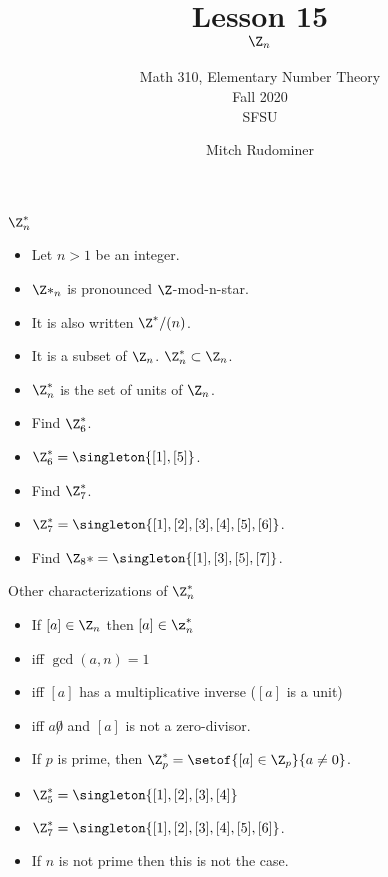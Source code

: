 \documentclass{beamer}
\title{Lesson 15 \\ $\Z_n$}
\subtitle{Math 310, Elementary Number Theory \\ Fall 2020 \\ SFSU}
\author{Mitch Rudominer}
\date{}
\begin{document}
\begin{frame}
  \titlepage
\end{frame}

\begin{frame}{$\Z^*_n$}

\begin{itemize}
  \item Let $n>1$ be an integer.
  \item $\Z*_n$ is pronounced $\Z$-mod-n-star.
  \item It is also written $\Z^*/(n)$.
  \item It is a subset of $\Z_n$. $\Z_n^* \subset \Z_n$.
  \item $\Z^*_n$ is the set of units of $\Z_n$.
  \item Find $\Z_6^*$.
  \item $\Z_6^*=\singleton{[1],[5]}$.
  \item Find $\Z_7^*$.
  \item $\Z_7^*=\singleton{[1],[2],[3],[4],[5],[6]}$.
  \item Find $\Z_8* = \singleton{[1],[3],[5],[7]}$.
\end{itemize}

\end{frame}

\begin{frame}{Other characterizations of $\Z^*_n$}

\begin{itemize}
  \item If $[a]\in\Z_n$ then $[a]\in\z_n^*$
  \item iff $\gcd(a,n)=1$
  \item iff $[a]$ has a multiplicative inverse ($[a]$ is a unit)
  \item iff $a\not 0$ and $[a]$ is not a zero-divisor.
  \item If $p$ is prime, then $\Z_p^*=\setof{[a]\in\Z_p}{a\not=0}$.
  \item $\Z_5^*=\singleton{[1],[2],[3],[4]}$
  \item $\Z_7^*=\singleton{[1],[2],[3],[4],[5],[6]}$.
  \item If $n$ is not prime then this is not the case.
\end{itemize}

\end{frame}
\end{document}
